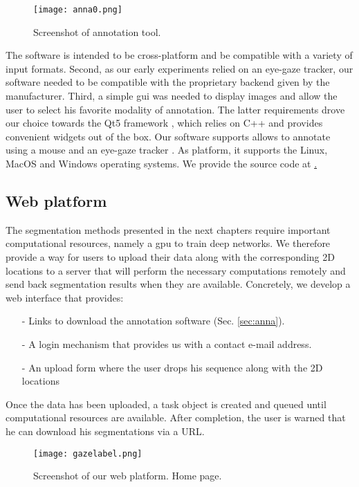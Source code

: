 \begin{figure}[!htpb]
  \texttt{[image: anna0.png]}
  \caption{Screenshot of annotation tool. }
  \label{fig:anna}
\end{figure}

The software is intended to be cross-platform and be compatible with a variety of input formats.
Second, as our early experiments relied on an eye-gaze tracker, our software needed to be compatible with the proprietary backend given by the manufacturer.
Third, a simple \gls{gui} was needed to display images and allow the user to select his favorite modality of annotation.
The latter requirements drove our choice towards the Qt5 framework \cite{eng16}, which relies on C++ and provides convenient widgets out of the box.
Our software supports allows to annotate using a mouse and an eye-gaze tracker \cite{eyetribe}.
As platform, it supports the Linux, MacOS and Windows operating systems.
We provide the source code at \href{https://github.com/aimi-lab/Anna}.

\subsection{Web platform}
The segmentation methods presented in the next chapters require important computational resources, namely a \gls{gpu} to train deep networks.
We therefore provide a way for users to upload their data along with the corresponding 2D locations to a server that will perform the necessary computations remotely and send back segmentation results when they are available.
Concretely, we develop a web interface that provides:

\begin{itemize}
  \item[-]{Links to download the annotation software (Sec. \ref{sec:anna}).}
  \item[-]{A login mechanism that provides us with a contact e-mail address.}
  \item[-]{An upload form where the user drops his sequence along with the 2D locations}
\end{itemize}

Once the data has been uploaded, a task object is created and queued until computational resources are available.
After completion, the user is warned that he can download his segmentations via a URL.

\begin{figure}[!htpb]
  \texttt{[image: gazelabel.png]}
  \caption{Screenshot of our web platform. Home page.}
  \label{fig:anna}
\end{figure}

